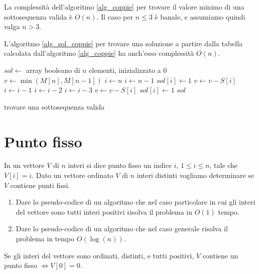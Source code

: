 La complessit\`a dell'algoritmo \ref{alg_coppie} per trovare il valore minimo di una sottosequenza valida \`e $O(n)$. Il caso per $n \le 3$ \`e banale, e assumiamo quindi valga $n > 3$.

L'algoritmo \ref{alg_sol_coppie} per trovare una soluzione a partire dalla tabella calcolata dall'algoritmo \ref{alg_coppie} ha anch'esso complessit\`a $O(n)$.

\begin{algorithm}
\begin{algorithmic}
    \State $sol \gets$ array booleano di $n$ elementi, inizializzato a 0
    \State $v \gets \min (M[n], M[n-1])$
        \State $i \gets n$
    \Else
        \State $i \gets n - 1$
    \EndIf
    \State $sol[i] \gets 1$
    \State $v \gets v - S[i]$
            \State $i \gets i - 1$
            \State $i \gets i - 2$
        \Else
            \State $i \gets i - 3$
        \EndIf
        \State $v \gets v - S[i]$
        \State $sol[i] \gets 1$
    \EndWhile
    \State \Return $sol$
\EndFunction
\end{algorithmic}
\caption{\label{alg_sol_coppie} trovare una sottosequenza valida}
\end{algorithm}

\clearpage

\section{Punto fisso}

\begin{esercizio}
In un vettore $V$ di $n$ interi si dice punto fisso un indice $i$, $1 \le i \le n$, tale che $V[i] = i$. Dato un vettore ordinato $V$ di $n$ interi distinti vogliamo determinare se $V$ contiene punti fissi.
\begin{enumerate}
    \item Dare lo pseudo-codice di un algoritmo che nel caso particolare in cui gli interi del vettore sono tutti interi positivi risolva il problema in $O(1)$ tempo.
    \item Dare lo pseudo-codice di un algoritmo che nel caso generale risolva il problema in tempo $O \left(\log (n) \right)$.
\end{enumerate}
\end{esercizio}

Se gli interi del vettore sono ordinati, distinti, e tutti positivi, $V$ contiene un punto fisso $\iff V[0] = 0$.

